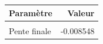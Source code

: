 \centering
\centering
\begin{tabular}[t]{lr}
\toprule
Paramètre & Valeur\\
\midrule
\cellcolor{gray!10}{Niveau final} & \cellcolor{gray!10}{101.650800}\\
Pente finale & -0.008548\\
\bottomrule
\end{tabular}

